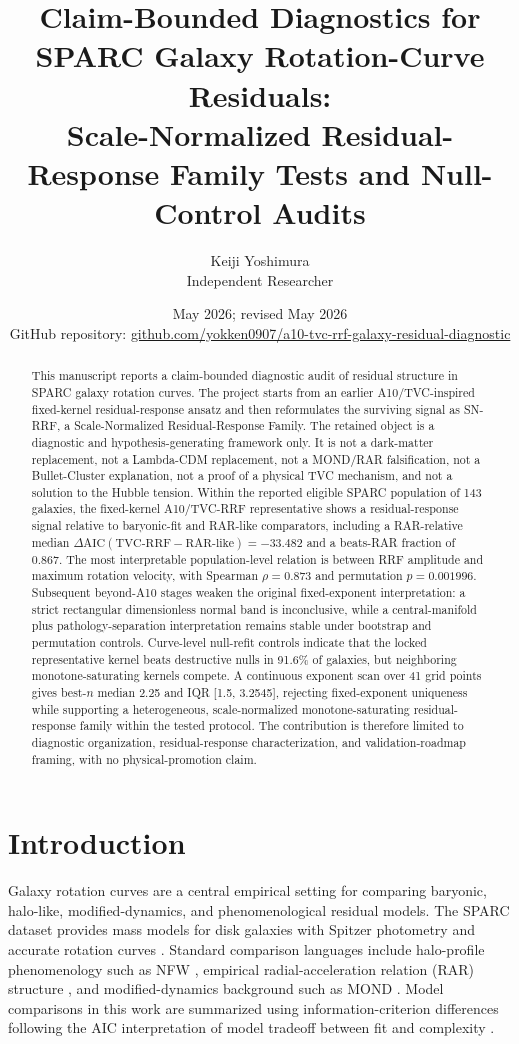 \documentclass[11pt,a4paper]{article}
\title{Claim-Bounded Diagnostics for SPARC Galaxy Rotation-Curve Residuals:\\
Scale-Normalized Residual-Response Family Tests and Null-Control Audits}
\author{Keiji Yoshimura\\Independent Researcher}
\date{May 2026; revised May 2026\\[0.25em]
\small GitHub repository: \href{https://github.com/yokken0907/a10-tvc-rrf-galaxy-residual-diagnostic}{github.com/yokken0907/a10-tvc-rrf-galaxy-residual-diagnostic}}
\newcommand{\dAIC}{\Delta\mathrm{AIC}}
\begin{document}
\maketitle


\begin{abstract}
This manuscript reports a claim-bounded diagnostic audit of residual structure in SPARC galaxy rotation curves. The project starts from an earlier A10/TVC-inspired fixed-kernel residual-response ansatz and then reformulates the surviving signal as SN-RRF, a Scale-Normalized Residual-Response Family. The retained object is a diagnostic and hypothesis-generating framework only. It is not a dark-matter replacement, not a Lambda-CDM replacement, not a MOND/RAR falsification, not a Bullet-Cluster explanation, not a proof of a physical TVC mechanism, and not a solution to the Hubble tension. Within the reported eligible SPARC population of 143 galaxies, the fixed-kernel A10/TVC-RRF representative shows a residual-response signal relative to baryonic-fit and RAR-like comparators, including a RAR-relative median $\dAIC(\mathrm{TVC\mbox{-}RRF}-\mathrm{RAR\mbox{-}like})=-33.482$ and a beats-RAR fraction of 0.867. The most interpretable population-level relation is between RRF amplitude and maximum rotation velocity, with Spearman $\rho=0.873$ and permutation $p=0.001996$. Subsequent beyond-A10 stages weaken the original fixed-exponent interpretation: a strict rectangular dimensionless normal band is inconclusive, while a central-manifold plus pathology-separation interpretation remains stable under bootstrap and permutation controls. Curve-level null-refit controls indicate that the locked representative kernel beats destructive nulls in 91.6\% of galaxies, but neighboring monotone-saturating kernels compete. A continuous exponent scan over 41 grid points gives best-$n$ median 2.25 and IQR [1.5, 3.2545], rejecting fixed-exponent uniqueness while supporting a heterogeneous, scale-normalized monotone-saturating residual-response family within the tested protocol. The contribution is therefore limited to diagnostic organization, residual-response characterization, and validation-roadmap framing, with no physical-promotion claim.
\end{abstract}


\section{Introduction}
Galaxy rotation curves are a central empirical setting for comparing baryonic, halo-like, modified-dynamics, and phenomenological residual models. The SPARC dataset provides mass models for disk galaxies with Spitzer photometry and accurate rotation curves \cite{Lelli2016SPARC}. Standard comparison languages include halo-profile phenomenology such as NFW \cite{Navarro1997NFW}, empirical radial-acceleration relation (RAR) structure \cite{McGaugh2016RAR}, and modified-dynamics background such as MOND \cite{Milgrom1983MOND}. Model comparisons in this work are summarized using information-criterion differences following the AIC interpretation of model tradeoff between fit and complexity \cite{Akaike1974AIC}.
\end{document}
